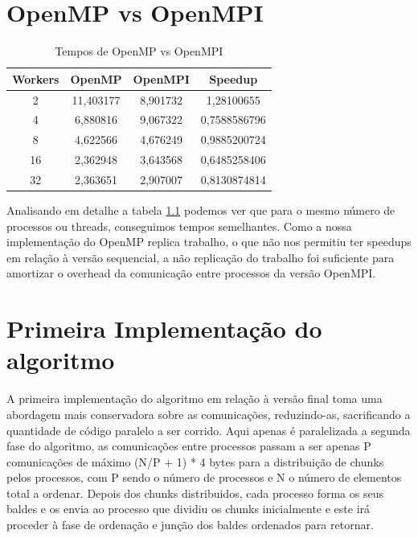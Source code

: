 \documentclass[a4paper]{report}
\begin{document}
\chapter{OpenMP vs OpenMPI}
\begin{table}[h]
    \centering
    \begin{tabular}{|c|c|c|c|}
        \hline
        Workers & OpenMP    & OpenMPI  & Speedup      \\ \hline
        2       & 11,403177 & 8,901732 & 1,28100655   \\ \hline
        4       & 6,880816  & 9,067322 & 0,7588586796 \\ \hline
        8       & 4,622566  & 4,676249 & 0,9885200724 \\ \hline
        16      & 2,362948  & 3,643568 & 0,6485258406 \\ \hline
        32      & 2,363651  & 2,907007 & 0,8130874814 \\ \hline
    \end{tabular}
    \caption{Tempos de OpenMP vs OpenMPI}
    \label{tab:ompi}
\end{table}

Analisando em detalhe a tabela \ref{tab:ompi} podemos ver que para o mesmo
número de processos ou threads, conseguimos tempos semelhantes. Como a nossa
implementação do OpenMP replica trabalho, o que não nos permitiu ter speedups em
relação à versão sequencial, a não replicação do trabalho foi suficiente para
amortizar o overhead da comunicação entre processos da versão OpenMPI.

\chapter{Primeira Implementação do algoritmo} \label{apx:slowpar}

A primeira implementação do algoritmo em relação à versão final toma uma
abordagem mais conservadora sobre as comunicações, reduzindo-as, sacrificando a
quantidade de código paralelo a ser corrido. Aqui apenas é paralelizada a
segunda fase do algoritmo, as comunicações entre processos passam a ser apenas P
comunicações de máximo (N/P + 1) * 4 bytes para a distribuição de chunks pelos
processos, com P sendo o número de processos e N o número de elementos total a
ordenar. Depois dos chunks distribuidos, cada processo forma os seus baldes e os
envia ao processo que dividiu os chunks inicialmente e este irá proceder à fase
de ordenação e junção dos baldes ordenados para retornar.
\end{document}
